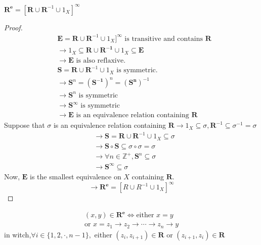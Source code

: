 \begin{Prop}
    $\mathbf{R^e}=[\mathbf{R} \cup \mathbf{R}^{-1} \cup 1_X]^{\infty}$
    \begin{proof}
        \begin{align*}
            &\mathbf{E}=\mathbf{R} \cup \mathbf{R}^{-1} \cup 1_X]^{\infty} \text{ is transitive and contains } \mathbf{R}    \\
            &\rightarrow 1_X \subseteq \mathbf{R}\cup \mathbf{R^{-1}}\cup 1_X \subseteq \mathbf{E}   \\
            &\rightarrow \mathbf{E} \text{ is also reflaxive.}  \\
            &\mathbf{S}=\mathbf{R} \cup \mathbf{R}^{-1} \cup 1_X \text{ is symmetric.}  \\
            &\rightarrow \mathbf{S}^n=(\mathbf{S^{-1}})^n=(\mathbf{S^n})^{-1}   \\
            &\rightarrow \mathbf{S}^n \text{ is symmetric}  \\
            &\rightarrow \mathbf{S}^{\infty} \text{ is symmetric}   \\
            &\rightarrow \mathbf{E} \text{ is an equivalence relation containing }\mathbf{R}
        \end{align*}
        Suppose that $\sigma$ is an equivalence relation containing $\mathbf{R}\rightarrow 1_X \subseteq \sigma , \mathbf{R}^{-1}\subseteq \sigma^{-1} =\sigma$
        \begin{align*}
            &\rightarrow \mathbf{S}=\mathbf{R} \cup \mathbf{R}^{-1} \cup 1_X \subseteq \sigma \\
            &\rightarrow \mathbf{S}\circ \mathbf{S} \subseteq \sigma \circ \sigma =\sigma \\
            &\rightarrow \forall n\in \mathbb{Z}^+, \mathbf{S}^n \subseteq \sigma   \\
            &\rightarrow \mathbf{S}^{\infty} \subseteq \sigma 
        \end{align*}
        Now, $\mathbf{E}$ is the smallest equivalence on $X$ containing $\mathbf{R}$.
        \[\rightarrow \mathbf{R^e}=[R\cup R^{-1}\cup 1_X]^{\infty}\]
    \end{proof}
\end{Prop}

\begin{Prop}
    \begin{align*}
        (x,y)\in \mathbf{R^e} \Leftrightarrow \text{either } x=y    \\
        \text{or } x=z_1\rightarrow z_2\rightarrow \cdots\rightarrow z_n\rightarrow y
    \end{align*}
    in witch,$\forall i \in \{1,2,\cdot,n-1\},$ either $(z_i,z_{i+1})\in \mathbf{R}$ or $(z_{i+1},z_i)\in \mathbf{R}$
\end{Prop}

